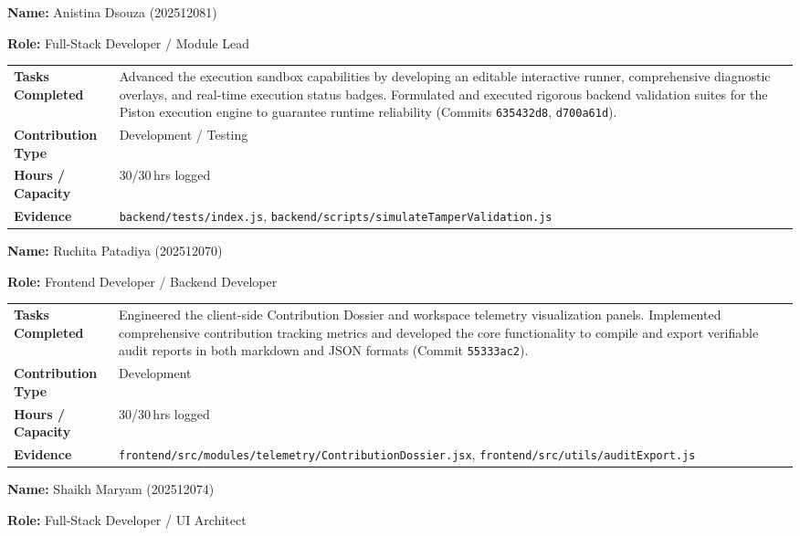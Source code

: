 \documentclass[11pt,a4paper]{article}
\newcommand{\field}[2]{\textbf{#1:} #2\par}
\begin{document}
\vspace{6pt}

\field{Name}{Anistina Dsouza (202512081)}
\field{Role}{Full-Stack Developer / Module Lead}

\vspace{4pt}
{\small
\begin{tabular}{>{\bfseries}p{} p{}}
\toprule
Tasks Completed & Advanced the execution sandbox capabilities by developing an editable interactive runner, comprehensive diagnostic overlays, and real-time execution status badges. Formulated and executed rigorous backend validation suites for the Piston execution engine to guarantee runtime reliability (Commits \texttt{635432d8}, \texttt{d700a61d}). \\
Contribution Type & Development / Testing \\
Hours / Capacity & 30/30\,hrs logged \\
Evidence & \texttt{backend/tests/index.js}, \texttt{backend/scripts/simulateTamperValidation.js} \\
\bottomrule
\end{tabular}
}

\vspace{6pt}

\field{Name}{Ruchita Patadiya (202512070)}
\field{Role}{Frontend Developer / Backend Developer}

\vspace{4pt}
{\small
\begin{tabular}{>{\bfseries}p{} p{}}
\toprule
Tasks Completed & Engineered the client-side Contribution Dossier and workspace telemetry visualization panels. Implemented comprehensive contribution tracking metrics and developed the core functionality to compile and export verifiable audit reports in both markdown and JSON formats (Commit \texttt{55333ac2}). \\
Contribution Type & Development \\
Hours / Capacity & 30/30\,hrs logged \\
Evidence & \texttt{frontend/src/modules/telemetry/ContributionDossier.jsx}, \texttt{frontend/src/utils/auditExport.js} \\
\bottomrule
\end{tabular}
}

\vspace{6pt}

\field{Name}{Shaikh Maryam (202512074)}
\field{Role}{Full-Stack Developer / UI Architect}
\end{document}
